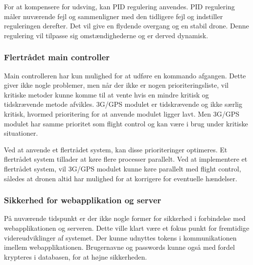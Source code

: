 For at kompensere for udsving, kan PID regulering anvendes. PID regulering måler nuværende fejl og sammenligner med den tidligere fejl og indstiller reguleringen derefter. Det vil give en flydende overgang og en stabil drone. Denne regulering vil tilpasse sig omstændighederne og er derved dynamisk.

\subsubsection*{Flertrådet main controller}

Main controlleren har kun mulighed for at udføre en kommando afgangen. Dette giver ikke nogle problemer, men når der ikke er nogen prioriteringsliste, vil kritiske metoder kunne komme til at vente hvis en mindre kritisk og tidskrævende metode afvikles. 
3G/GPS modulet er tidskrævende og ikke særlig kritisk, hvormed prioritering for at anvende modulet ligger lavt. Men 3G/GPS modulet har samme prioritet som flight control og kan være i brug under kritiske situationer. 

Ved at anvende et flertrådet system, kan disse prioriteringer optimeres. Et flertrådet system tillader at køre flere processer parallelt. Ved at implementere et flertrådet system, vil 3G/GPS modulet kunne køre parallelt med flight control, således at dronen altid har mulighed for at korrigere for eventuelle hændelser. 

\subsubsection*{Sikkerhed for webapplikation og server}
På nuværende tidspunkt er der ikke nogle former for sikkerhed i forbindelse med webapplikationen og serveren. Dette ville klart være et fokus punkt for fremtidige videreudviklinger af systemet. Der kunne udnyttes tokens i kommunikationen imellem webapplikationen. 
Brugernavne og passwords kunne også med fordel krypteres i databasen, for at højne sikkerheden.

